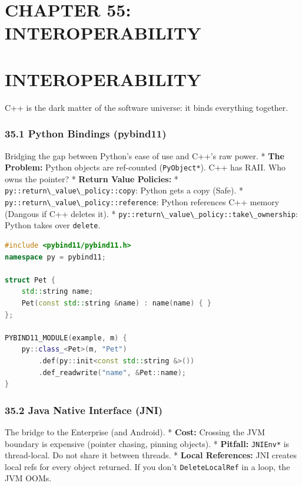 \hypertarget{chapter-55-interoperability}{%
\section{CHAPTER 55:
INTEROPERABILITY}\label{chapter-55-interoperability}}

\hypertarget{interoperability}{%
\section{INTEROPERABILITY}\label{interoperability}}

C++ is the dark matter of the software universe: it binds everything
together.

\hypertarget{python-bindings-pybind11}{%
\subsubsection{35.1 Python Bindings
(pybind11)}\label{python-bindings-pybind11}}

Bridging the gap between Python's ease of use and C++'s raw power. *
\textbf{The Problem:} Python objects are ref-counted
(\passthrough{\lstinline!PyObject*!}). C++ has RAII. Who owns the
pointer? * \textbf{Return Value Policies:} *
\passthrough{\lstinline!py::return\_value\_policy::copy!}: Python gets a
copy (Safe). *
\passthrough{\lstinline!py::return\_value\_policy::reference!}: Python
references C++ memory (Dangous if C++ deletes it). *
\passthrough{\lstinline!py::return\_value\_policy::take\_ownership!}:
Python takes over \passthrough{\lstinline!delete!}.

\begin{lstlisting}[language={C++}]
#include <pybind11/pybind11.h>
namespace py = pybind11;

struct Pet {
    std::string name;
    Pet(const std::string &name) : name(name) { }
};

PYBIND11_MODULE(example, m) {
    py::class_<Pet>(m, "Pet")
        .def(py::init<const std::string &>())
        .def_readwrite("name", &Pet::name);
}
\end{lstlisting}

\hypertarget{java-native-interface-jni}{%
\subsubsection{35.2 Java Native Interface
(JNI)}\label{java-native-interface-jni}}

The bridge to the Enterprise (and Android). * \textbf{Cost:} Crossing
the JVM boundary is expensive (pointer chasing, pinning objects). *
\textbf{Pitfall:} \passthrough{\lstinline!JNIEnv*!} is thread-local. Do
not share it between threads. * \textbf{Local References:} JNI creates
local refs for every object returned. If you don't
\passthrough{\lstinline!DeleteLocalRef!} in a loop, the JVM OOMs.

